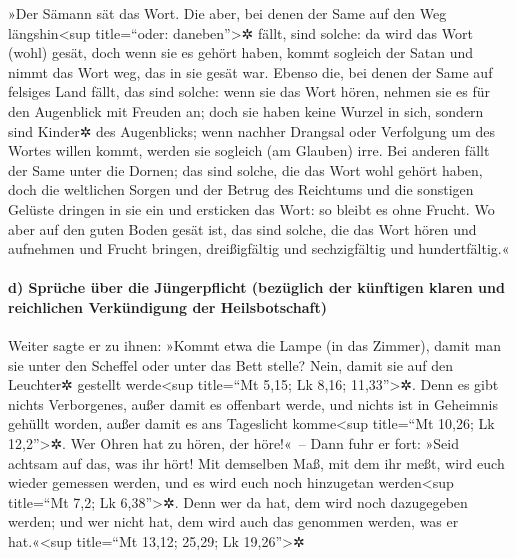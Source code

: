  »Der Sämann sät das Wort.  Die aber, bei
denen der Same auf den Weg längshin\textless sup title=``oder:
daneben''\textgreater✲ fällt, sind solche: da wird das Wort (wohl)
gesät, doch wenn sie es gehört haben, kommt sogleich der Satan und nimmt
das Wort weg, das in sie gesät war.  Ebenso die, bei
denen der Same auf felsiges Land fällt, das sind solche: wenn sie das
Wort hören, nehmen sie es für den Augenblick mit Freuden an;
 doch sie haben keine Wurzel in sich, sondern sind
Kinder✲ des Augenblicks; wenn nachher Drangsal oder Verfolgung um des
Wortes willen kommt, werden sie sogleich (am Glauben) irre.
 Bei anderen fällt der Same unter die Dornen; das sind
solche, die das Wort wohl gehört haben,  doch die
weltlichen Sorgen und der Betrug des Reichtums und die sonstigen Gelüste
dringen in sie ein und ersticken das Wort: so bleibt es ohne Frucht.
 Wo aber auf den guten Boden gesät ist, das sind solche,
die das Wort hören und aufnehmen und Frucht bringen, dreißigfältig und
sechzigfältig und hundertfältig.«

\hypertarget{d-spruxfcche-uxfcber-die-juxfcngerpflicht-bezuxfcglich-der-kuxfcnftigen-klaren-und-reichlichen-verkuxfcndigung-der-heilsbotschaft}{%
\paragraph{d) Sprüche über die Jüngerpflicht (bezüglich der künftigen
klaren und reichlichen Verkündigung der
Heilsbotschaft)}\label{d-spruxfcche-uxfcber-die-juxfcngerpflicht-bezuxfcglich-der-kuxfcnftigen-klaren-und-reichlichen-verkuxfcndigung-der-heilsbotschaft}}

 Weiter sagte er zu ihnen: »Kommt etwa die Lampe (in das
Zimmer), damit man sie unter den Scheffel oder unter das Bett stelle?
Nein, damit sie auf den Leuchter✲ gestellt werde\textless sup title=``Mt
5,15; Lk 8,16; 11,33''\textgreater✲.  Denn es gibt nichts
Verborgenes, außer damit es offenbart werde, und nichts ist in Geheimnis
gehüllt worden, außer damit es ans Tageslicht komme\textless sup
title=``Mt 10,26; Lk 12,2''\textgreater✲.  Wer Ohren hat
zu hören, der höre!«~--  Dann fuhr er fort: »Seid achtsam
auf das, was ihr hört! Mit demselben Maß, mit dem ihr meßt, wird euch
wieder gemessen werden, und es wird euch noch hinzugetan
werden\textless sup title=``Mt 7,2; Lk 6,38''\textgreater✲.
 Denn wer da hat, dem wird noch dazugegeben werden; und
wer nicht hat, dem wird auch das genommen werden, was er
hat.«\textless sup title=``Mt 13,12; 25,29; Lk 19,26''\textgreater✲

